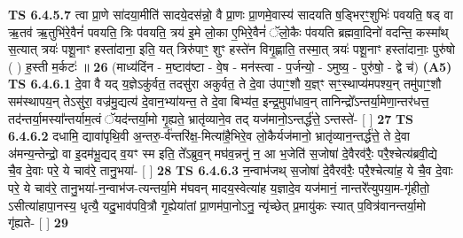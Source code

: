 \documentclass[17pt]{extarticle}
\begin{document}
                  \newline
                                \textbf{ TS 6.4.5.7} \newline
                  त्वा प्रा॒णे सा॑दया॒मीति॑ सादये॒दस॑न्नो॒ वै प्रा॒णः प्रा॒णमे॒वास्य॑ सादयति ष॒ड्भिरꣳ॒॒शुभिः॑ पवयति॒ षड् वा ऋ॒तव॑ ऋ॒तुभि॑रे॒वैनं॑ पवयति॒ त्रिः प॑वयति॒ त्रय॑ इ॒मे लो॒का ए॒भिरे॒वैनं॑ ॅलो॒कैः प॑वयति ब्रह्मवा॒दिनो॑ वदन्ति॒ कस्मा᳚थ् स॒त्यात् त्रयः॑ पशू॒नाꣳ हस्ता॑दाना॒ इति॒ यत् त्रिरु॑पाꣳ॒॒ शुꣳ हस्ते॑न विगृ॒ह्णाति॒ तस्मा॒त् त्रयः॑ पशू॒नाꣳ हस्ता॑दानाः॒ पुरु॑षो ( ) ह॒स्ती म॒र्कटः॑ ॥ \textbf{  26 } \newline
                  \newline
                      (माध्य॑दिंन - म॒ष्टाव॑ष्टा - वे॒ष - मन॑स्त्वा - प॒र्जन्यो॒ - ऽमुष्य॒ - पुरु॑षो॒ - द्वे च॑)  \textbf{(A5)} \newline \newline
                                        \textbf{ TS 6.4.6.1} \newline
                  दे॒वा वै यद् य॒ज्ञेऽकु॑र्वत॒ तदसु॑रा अकुर्वत॒ ते दे॒वा उ॑पाꣳ॒॒शौ य॒ज्ञ्ꣳ सꣳ॒॒स्थाप्य॑मपश्य॒न् तमु॑पाꣳ॒॒शौ सम॑स्थापय॒न् तेऽसु॑रा॒ वज्र॑मु॒द्यत्य॑ दे॒वान॒भ्या॑यन्त॒ ते दे॒वा बिभ्य॑त॒ इन्द्र॒मुपा॑धाव॒न् तानिन्द्रो᳚ऽन्तर्या॒मेणा॒न्तर॑धत्त॒ तद॑न्तर्या॒मस्या᳚न्तर्याम॒त्वं ॅयद॑न्तर्या॒मो गृ॒ह्यते॒ भ्रातृ॑व्याने॒व तद् यज॑मानो॒ऽन्तर्द्ध॑त्ते॒ ऽन्तस्ते॑- [  ] \textbf{  27} \newline
                  \newline
                                \textbf{ TS 6.4.6.2} \newline
                  दधामि॒ द्यावा॑पृथि॒वी अ॒न्तरु॒-र्व॑न्तरि॑क्ष॒-मित्या॑है॒भिरे॒व लो॒कैर्यज॑मानो॒ भ्रातृ॑व्यान॒न्तर्द्ध॑त्ते॒ ते दे॒वा अ॑मन्य॒न्तेन्द्रो॒ वा इ॒दम॑भू॒द्यद् व॒यꣳ स्म इति॒ ते᳚ऽब्रुव॒न् मघ॑व॒न्ननु॑ न॒ आ भ॒जेति॑ स॒जोषा॑ दे॒वैरव॑रैः॒ परै॒श्चेत्य॑ब्रवी॒द्ये चै॒व दे॒वाः परे॒ ये चाव॑रे॒ तानु॒भया॑- [  ] \textbf{  28} \newline
                  \newline
                                \textbf{ TS 6.4.6.3} \newline
                  न॒न्वाभ॑जथ् स॒जोषा॑ दे॒वैरव॑रैः॒ परै॒श्चेत्या॑ह॒ ये चै॒व दे॒वाः परे॒ ये चाव॑रे॒ तानु॒भया॑-न॒न्वाभ॑ज-त्यन्तर्या॒मे म॑घवन् मादय॒स्वेत्या॑ह य॒ज्ञादे॒व यज॑मानं॒ नान्तरे᳚त्युपया॒म-गृ॑हीतो॒ ऽसीत्या॑हापा॒नस्य॒ धृत्यै॒ यदु॒भाव॑पवि॒त्रौ गृ॒ह्येया॑तां प्रा॒णम॑पा॒नोऽनु॒ न्यृ॑च्छेत् प्र॒मायु॑कः स्यात् प॒वित्र॑वानन्तर्या॒मो गृ॑ह्यते- [  ] \textbf{  29} \newline
                  \newline
\end{document}
